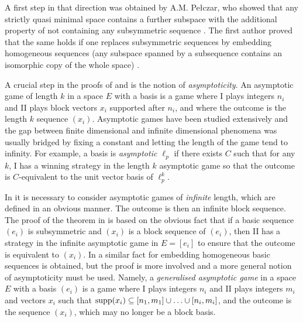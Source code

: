 \documentclass[10pt]{amsart}
\numberwithin{equation}{section}
\begin{document}
A first step in that direction was obtained by A.M. Pe\l czar, who showed that
any strictly quasi minimal space contains a further subspace with the
additional property of not containing any subsymmetric sequence \cite{anna}.
The first author proved that the same holds if one replaces subsymmetric
sequences by embedding homogeneous sequences (any subspace spanned by a
subsequence contains an isomorphic copy of the whole space) \cite{subsurfaces}.

A crucial step in the proofs of \cite{anna} and \cite{subsurfaces} is the
notion of {\em asymptoticity}. An asymptotic game of length $k$ in a space $E$
with a basis is a game where I plays integers $n_i$ and II plays block vectors
$x_i$ supported after $n_i$, and where the outcome is the length $k$ sequence
$(x_i)$. Asymptotic games have been  studied extensively and  the gap between
finite dimensional and infinite dimensional phenomena was usually bridged by
fixing a constant  and letting the length of the game tend to infinity. For
example, a basis is {\em asymptotic $\ell_p$}  if there exists $C$ such that
for any $k$, I has a winning strategy in the length $k$ asymptotic game so that
the outcome is $C$-equivalent to the unit vector basis of $\ell_p^k$.

In \cite{anna} it is necessary to consider asymptotic games of {\em infinite}
length, which are defined in an obvious manner. The outcome is then an infinite
block sequence. The proof of the theorem  in \cite{anna} is based on the
obvious fact that if a basic sequence $(e_i)$ is  subsymmetric and $(x_i)$ is a
block sequence of $(e_i)$, then II has a strategy in the infinite asymptotic
game in $E=[e_i]$ to ensure that the outcome is equivalent to $(x_i)$. In
\cite{subsurfaces} a similar fact for embedding homogeneous basic sequences is
obtained, but the proof is  more involved and a more general notion of
asymptoticity must be used. Namely, a {\em generalised asymptotic game} in a
space $E$ with a basis $(e_i)$ is a game where I plays integers $n_i$ and II
plays integers $m_i$ and vectors $x_i$ such that ${\rm supp}(x_i) \subseteq
[n_1,m_1]\cup\ldots\cup[n_i,m_i]$, and the outcome is the sequence $(x_i)$,
which may no longer be a block basis.
\end{document}
